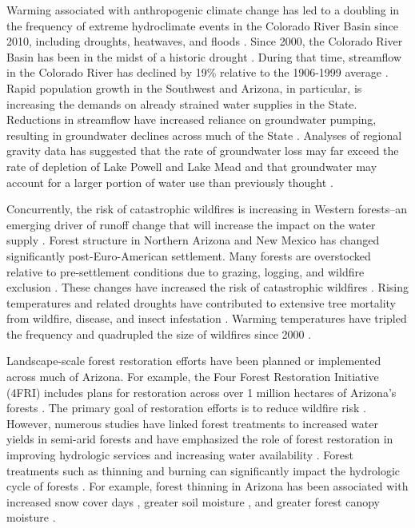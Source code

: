 \documentclass[
  number,
  preprint,
  3p,
  onecolumn]{elsarticle}
\begin{document}
Warming associated with anthropogenic climate change has led to a
doubling in the frequency of extreme hydroclimate events in the Colorado
River Basin since 2010, including droughts, heatwaves, and floods
\citep{bennett_concurrent_2021}. Since 2000, the Colorado River Basin
has been in the midst of a historic drought
\citep{meko_treering_2022, williams_rapid_2022}. During that time,
streamflow in the Colorado River has declined by 19\% relative to the
1906-1999 average \citep{hogan_recent_2024, udall_twentyfirst_2017}.
Rapid population growth in the Southwest and Arizona, in particular, is
increasing the demands on already strained water supplies in the State.
Reductions in streamflow have increased reliance on groundwater pumping,
resulting in groundwater declines across much of the State
\citep{tadych_historical_2024}. Analyses of regional gravity data has
suggested that the rate of groundwater loss may far exceed the rate of
depletion of Lake Powell and Lake Mead and that groundwater may account
for a larger portion of water use than previously thought
\citep{castle2014}.

Concurrently, the risk of catastrophic wildfires is increasing in
Western forests--an emerging driver of runoff change that will increase
the impact on the water supply \citep{williams_rapid_2022}. Forest
structure in Northern Arizona and New Mexico has changed significantly
post-Euro-American settlement. Many forests are overstocked relative to
pre-settlement conditions due to grazing, logging, and wildfire
exclusion \citep{covington_southwestern_1994, friederici2013}. These
changes have increased the risk of catastrophic wildfires
\citep{allen_ecological_2002}. Rising temperatures and related droughts
have contributed to extensive tree mortality from wildfire, disease, and
insect infestation \citep{berner_tree_2017}. Warming temperatures have
tripled the frequency and quadrupled the size of wildfires since 2000
\citep{iglesias2022}.

Landscape-scale forest restoration efforts have been planned or
implemented across much of Arizona. For example, the Four Forest
Restoration Initiative (4FRI) includes plans for restoration across over
1 million hectares of Arizona's forests
\citep{schultz_collaborative_2012}. The primary goal of restoration
efforts is to reduce wildfire risk
\citep{allen_ecological_2002, friederici2013}. However, numerous studies
have linked forest treatments to increased water yields in semi-arid
forests and have emphasized the role of forest restoration in improving
hydrologic services and increasing water availability
\citep{bosch_review_1982, baker_effects_1986, gottfried_moderate_1991, smerdon_overview_2009, zou_streamflow_2010, wyatt_estimating_2013, moreno_modeling_2015, simonit_impact_2015, wyatt_semiarid_2015, odonnell_forest_2018, schenk_impacts_2020, hibbert1979}.
Forest treatments such as thinning and burning can significantly impact
the hydrologic cycle of forests \citep{del_campo_global_2022}. For
example, forest thinning in Arizona has been associated with increased
snow cover days
\citep{sankey_multi-scale_2015, belmonte_uav-based_2021, donager_integrating_2021},
greater soil moisture \citep{belmonte_soil_2022, sankey_thinning_2022},
and greater forest canopy moisture \citep{sankey_regionalscale_2021}.
\end{document}
